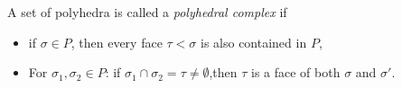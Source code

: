 

    A set of polyhedra is called a \emph{polyhedral complex} if
    \begin{itemize}
        \item if $\sigma\in P$, then every face $\tau< \sigma$ is also contained in $P$,
        \item For $\sigma_1, \sigma_2\in P$: if $\sigma_1\cap\sigma_2= \tau \neq \emptyset$,then $\tau$ is a face of both $\sigma$ and $\sigma'$. 
    \end{itemize}


